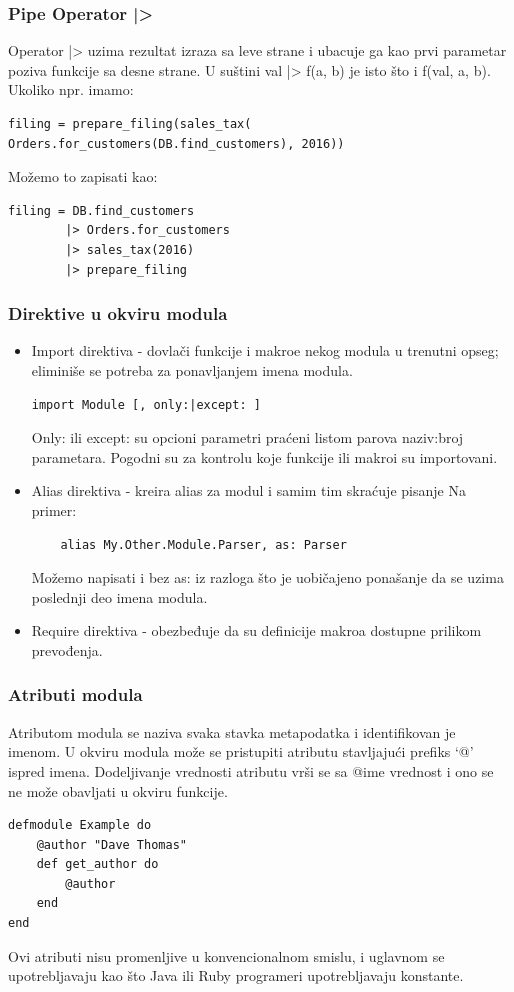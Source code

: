 \documentclass[a4paper]{article}
\begin{document}
\subsubsection{Pipe Operator |>}
Operator |> uzima rezultat izraza sa leve strane i ubacuje ga kao prvi parametar poziva funkcije sa desne strane. U suštini val |> f(a, b) je isto što i f(val, a, b). Ukoliko npr. imamo:
\begin{verbatim}
filing = prepare_filing(sales_tax(
Orders.for_customers(DB.find_customers), 2016))
\end{verbatim}
Možemo to zapisati kao:
\begin{verbatim}
filing = DB.find_customers
        |> Orders.for_customers
        |> sales_tax(2016)
        |> prepare_filing
\end{verbatim}

\subsubsection{Direktive u okviru modula}
\begin{itemize}
    \item Import direktiva - dovlači funkcije i makroe nekog modula u trenutni opseg; eliminiše se potreba za ponavljanjem imena modula.
    \begin{verbatim}
import Module [, only:|except: ]
    \end{verbatim}
    Only: ili except: su opcioni parametri  praćeni  listom parova naziv:broj parametara. Pogodni su za kontrolu koje funkcije ili makroi su importovani.
    \item Alias direktiva - kreira alias za modul i samim tim skraćuje pisanje
    Na primer:
    \begin{verbatim}
    alias My.Other.Module.Parser, as: Parser
    \end{verbatim}
    Možemo napisati i bez as: iz razloga što je uobičajeno ponašanje da se uzima poslednji deo imena modula.
    \item Require direktiva - obezbeđuje da su definicije makroa dostupne prilikom prevođenja.
\end{itemize}

\subsubsection{Atributi modula}
Atributom modula se naziva svaka stavka metapodatka i identifikovan je imenom. U okviru modula može se pristupiti atributu stavljajući prefiks ‘@’  ispred imena. Dodeljivanje vrednosti atributu vrši se sa @ime vrednost i ono se ne može obavljati u okviru funkcije.
\begin{verbatim}
defmodule Example do
    @author "Dave Thomas"
    def get_author do
        @author
    end
end
\end{verbatim}
Ovi atributi nisu promenljive u konvencionalnom smislu, i uglavnom se upotrebljavaju kao što Java ili Ruby programeri upotrebljavaju konstante.
\end{document}
